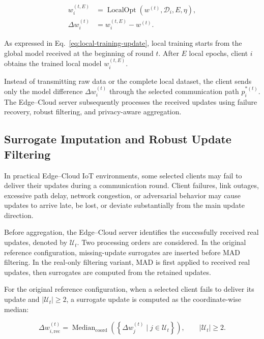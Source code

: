 \documentclass[5p,times,numafflabel]{elsarticle}
\begin{document}
	\begin{equation}
		\begin{aligned}
			w_{i}^{(t,E)}
			&=
			\operatorname{LocalOpt}
			\left(
			w^{(t)},\mathcal{D}_{i},E,\eta
			\right),\\
			\Delta w_{i}^{(t)}
			&=
			w_{i}^{(t,E)}-w^{(t)}.
		\end{aligned}
		\label{eq:local-training-update}
	\end{equation}
	
	As expressed in Eq.~\eqref{eq:local-training-update}, local training
	starts from the global model received at the beginning of round
	\(t\). After \(E\) local epochs, client \(i\) obtains the trained
	local model \(w_{i}^{(t,E)}\).
	
	Instead of transmitting raw data or the complete local dataset, the
	client sends only the model difference
	\(\Delta w_{i}^{(t)}\) through the selected communication path
	\(p_{i}^{*(t)}\). The Edge--Cloud server subsequently processes the
	received updates using failure recovery, robust filtering, and
	privacy-aware aggregation.
	\subsection{Surrogate Imputation and Robust Update Filtering}
	\label{subsec:failure-recovery}
	
	In practical Edge--Cloud IoT environments, some selected clients may
	fail to deliver their updates during a communication round. Client
	failures, link outages, excessive path delay, network congestion, or
	adversarial behavior may cause updates to arrive late, be lost, or
	deviate substantially from the main update direction.
	
	Before aggregation, the Edge--Cloud server identifies the successfully
	received real updates, denoted by \(\mathcal{U}_{t}\). Two processing
	orders are considered. In the original reference configuration,
	missing-update surrogates are inserted before MAD filtering.
	In the real-only filtering variant, MAD is first applied to received
	real updates, then surrogates are computed from the retained updates.
	
	For the original reference configuration, when a selected client
	fails to deliver its update and \(|\mathcal{U}_{t}|\geq 2\),
	a surrogate update is computed as the coordinate-wise median:
	
\begin{equation}
	\Delta w_{i,\mathrm{rec}}^{(t)}
	=
	\operatorname{Median}_{\mathrm{coord}}
	\left(
	\left\{
	\Delta w_{j}^{(t)}
	\mid j\in\mathcal{U}_{t}
	\right\}
	\right),
	\qquad
	|\mathcal{U}_{t}|\geq 2.
	\label{eq:recovered-update}
\end{equation}
	
\end{document}
